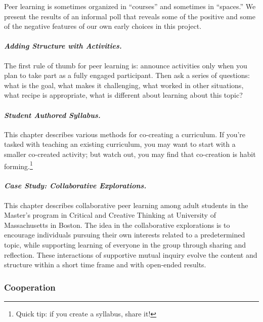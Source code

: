 Peer learning is sometimes organized in ``courses'' and sometimes in
``spaces.'' We present the results of an informal poll that reveals some
of the positive and some of the negative features of our own early
choices in this project.

\paragraph{\emph{Adding Structure with
Activities.}}\label{adding-structure-with-activities.}

The first rule of thumb for peer learning is: announce activities only
when you plan to take part as a fully engaged participant. Then ask a
series of questions: what is the goal, what makes it challenging, what
worked in other situations, what recipe is appropriate, what is
different about learning about this topic?

\paragraph{\emph{Student Authored
Syllabus.}}\label{student-authored-syllabus.}

This chapter describes various methods for co-creating a curriculum. If
you're tasked with teaching an existing curriculum, you may want to
start with a smaller co-created activity; but watch out, you may find
that co-creation is habit forming.\footnote{Quick tip: if you create a
  syllabus, share it!}

\paragraph{\emph{Case Study: Collaborative
Explorations.}}\label{case-study-collaborative-explorations.}

This chapter describes collaborative peer learning among adult students
in the Master's program in Critical and Creative Thinking at University
of Massachusetts in Boston. The idea in the collaborative explorations
is to encourage individuals pursuing their own interests related to a
predetermined topic, while supporting learning of everyone in the group
through sharing and reflection. These interactions of supportive mutual
inquiry evolve the content and structure within a short time frame and
with open-ended results.

\subsubsection{Cooperation}\label{cooperation}

